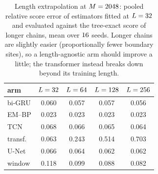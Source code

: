 \begin{table}[t]\centering\small\setlength{\tabcolsep}{4pt}
\caption{Length extrapolation at $M=2048$: pooled relative score error of estimators fitted at $L=32$ and evaluated against the tree-exact score of longer chains, mean over $16$ seeds. Longer chains are slightly easier (proportionally fewer boundary sites), so a length-agnostic arm should improve a little; the transformer instead breaks down beyond its training length.}
\label{tab:length}
\begin{tabular}{@{}lcccc@{}}
\toprule
arm & $L=32$ & $L=64$ & $L=128$ & $L=256$ \\
\midrule
bi-GRU & 0.060 & 0.057 & 0.057 & 0.056 \\
EM--BP & 0.023 & 0.023 & 0.023 & 0.023 \\
TCN & 0.068 & 0.066 & 0.065 & 0.064 \\
transf. & 0.063 & 0.243 & 0.514 & 0.703 \\
U-Net & 0.066 & 0.064 & 0.062 & 0.062 \\
window & 0.118 & 0.099 & 0.088 & 0.082 \\
\bottomrule
\end{tabular}
\end{table}
